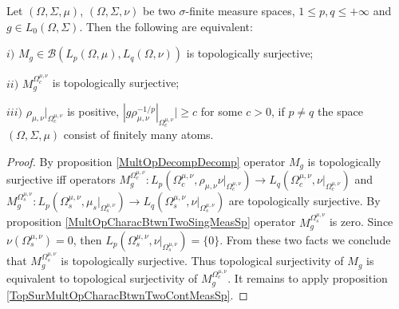 \begin{proposition}\label{TopSurMultOpCharacBtwnTwoMeasSp} Let $(\Omega,\Sigma,\mu)$, $(\Omega,\Sigma,\nu)$ be two $\sigma$-finite measure spaces, $1\leq p,q\leq +\infty$ and $g\in L_0(\Omega,\Sigma)$. Then the following are equivalent:

$i)$ $M_g\in\mathcal{B}(L_p(\Omega,\mu), L_q(\Omega,\nu))$ is topologically surjective;

$ii)$ $M_g^{\Omega_c^{\mu,\nu}}$ is topologically surjective;

$iii)$ $\rho_{\mu,\nu}|_{\Omega_c^{\mu,\nu}}$ is positive, $|g \rho_{\mu,\nu}^{-1/p}|_{\Omega_c^{\mu,\nu}}|\geq c$ for some $c>0$, if $p\neq q$ the space $(\Omega,\Sigma,\mu)$ consist of finitely many atoms.
\end{proposition}
\begin{proof}
By proposition \ref{MultOpDecompDecomp} operator $M_g$ is topologically surjective iff operators $M_g^{\Omega_c^{\mu,\nu}}:L_p(\Omega_c^{\mu,\nu},\rho_{\mu,\nu} \nu|_{\Omega_c^{\mu,\nu}})\to L_q(\Omega_c^{\mu,\nu},\nu|_{\Omega_c^{\mu,\nu}})$ and $M_g^{\Omega_s^{\mu,\nu}}:L_p(\Omega_s^{\mu,\nu},\mu_s|_{\Omega_s^{\mu,\nu}})\to L_q(\Omega_s^{\mu,\nu},\nu|_{\Omega_s^{\mu,\nu}})$ are topologically surjective. By proposition \ref{MultOpCharacBtwnTwoSingMeasSp} operator $M_g^{\Omega_s^{\mu,\nu}}$ is zero. Since $\nu(\Omega_s^{\mu,\nu})=0$, then $L_p(\Omega_s^{\mu,\nu},\nu|_{\Omega_s^{\mu,\nu}})=\{0\}$. From these two facts we conclude that $M_g^{\Omega_s^{\mu,\nu}}$ is topologically surjective. Thus topological surjectivity of $M_g$ is equivalent to topological surjectivity of  $M_g^{\Omega_c^{\mu,\nu}}$. It remains to apply proposition \ref{TopSurMultOpCharacBtwnTwoContMeasSp}.
\end{proof}


